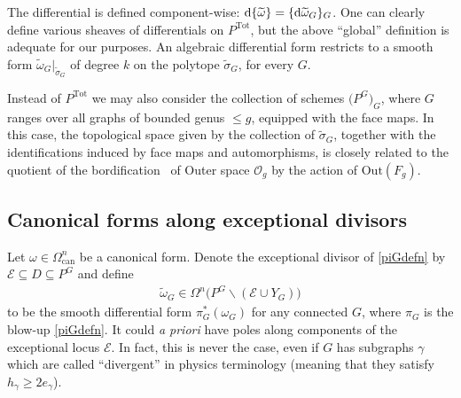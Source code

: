 \documentclass[pdftex]{sigma}%
\numberwithin{equation}{section}
\newcommand{\can}{\mathrm{can}}
\newcommand{\0}{\color{blue}{\mathsf{0}}}
\begin{document}
The differential is defined component-wise: ${\rm d} \{\widetilde{\omega}\} = \{ {\rm d} \widetilde{\omega}_G\}_G$. One can clearly define various sheaves of differentials on $P^{\mathrm{Tot}}$, but the above ``global'' definition is adequate for our purposes.
An algebraic differential form restricts to a smooth form
$\widetilde{\omega}_G\big|_{ \widetilde{\sigma}_G} $ of degree $k$
on the polytope $\widetilde{\sigma}_G$, for every $G$.


\begin{rem} Instead of $P^{\mathrm{Tot}}$ we may also consider the collection of schemes $\big(P^G\big)_G$, where $G$ ranges over all graphs of bounded genus $\leq g$, equipped with the face maps. In this case, the topological space given by the collection of $\widetilde{\sigma}_G$, together with the identifications induced by face maps and automorphisms, is closely related to the quotient of the bordification~\cite{BordificationOuterSpace} of Outer space $\mathcal{O}_g$ by the action of $\mathrm{Out}(F_g)$. \end{rem}


\subsection{Canonical forms along exceptional divisors}
Let $\omega \in \Omega^n_{\can}$ be a canonical form.
Denote the exceptional divisor of \eqref{piGdefn} by $\mathcal{E} \subseteq D \subseteq P^G$ and define
\begin{gather*} %
\widetilde{\omega}_G \in \Omega^{n} \big(P^G \backslash (\mathcal{E} \cup Y_G)\big)
\end{gather*}
to be the smooth differential form $ \pi^*_G (\omega_G)$ for any connected $G$, where $\pi_G$ is the blow-up \eqref{piGdefn}. It could \emph{a priori} have poles along components of the exceptional locus $\mathcal{E}$. In fact, this is never the case, even if $G$ has subgraphs $\gamma$ which are called ``divergent'' in physics terminology
 (meaning that they satisfy $h_{\gamma} \geq 2 e_{\gamma}$).
\end{document}
